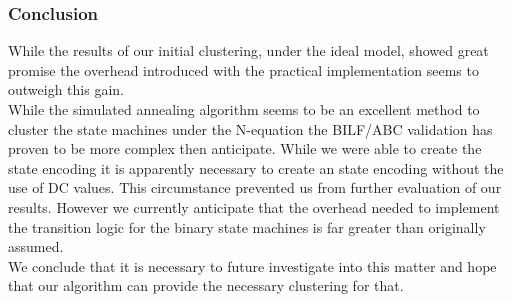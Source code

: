\newpage
\subsubsection{Conclusion}
\label{subsubsec:Conclusion}

While the results of our initial clustering, under the ideal model, showed great promise the overhead introduced with the practical implementation seems to outweigh this gain. \\
While the simulated annealing algorithm seems to be an excellent method to cluster the state machines under the N-equation the BILF/ABC validation has proven to be more complex then anticipate. While we were able to create the state encoding it is apparently necessary to create an state encoding without the use of DC values. This circumstance prevented us from further evaluation of our results. However we currently anticipate that the overhead needed to implement the transition logic for the binary state machines is far greater than originally assumed.\\
We conclude that it is necessary to future investigate into this matter and hope that our algorithm can provide the necessary clustering for that.







